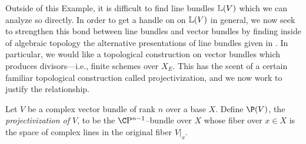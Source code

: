 Outside of this Example, it is difficult to find line bundles \(\mathbb{L}(V)\) which we can analyze so directly.  In order to get a handle on on \(\mathbb{L}(V)\) in general, we now seek to strengthen this bond between line bundles and vector bundles by finding inside of algebraic topology the alternative presentations of line bundles given in .  In particular, we would like a topological construction on vector bundles which produces divisors---i.e., finite schemes over \(X_E\).  This has the scent of a certain familiar topological construction called projectivization, and we now work to justify the relationship.

\begin{definition}
Let \(V\) be a complex vector bundle of rank \(n\) over a base \(X\).  Define \(\P(V)\), the \textit{projectivization of \(V\)}, to be the \(\CP^{n-1}\)--bundle over \(X\) whose fiber over \(x \in X\) is the space of complex lines in the original fiber \(V|_x\).
\end{definition}

